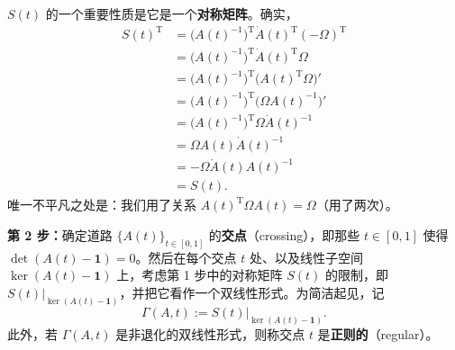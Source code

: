 $S(t)$ 的一个重要性质是它是一个\textbf{对称矩阵}。确实，
\begin{equation*}
\begin{aligned}
  S(t)^{\mathrm T}
    &=\bigl(A(t)^{-1}\bigr)^{\mathrm T}\dot A(t)^{\mathrm T}(-\Omega)^{\mathrm T}\\
    &=\bigl(A(t)^{-1}\bigr)^{\mathrm T}\dot A(t)^{\mathrm T}\Omega\\
    &=\bigl(A(t)^{-1}\bigr)^{\mathrm T}\bigl(A(t)^{\mathrm T}\Omega\bigr)'\\
    &=\bigl(A(t)^{-1}\bigr)^{\mathrm T}\bigl(\Omega A(t)^{-1}\bigr)'\\
    &=\bigl(A(t)^{-1}\bigr)^{\mathrm T}\Omega\dot A(t)^{-1}\\
    &=\Omega A(t)\dot A(t)^{-1}\\
    &=-\Omega\dot A(t)A(t)^{-1}\\
    &=S(t).
\end{aligned}
\end{equation*}
唯一不平凡之处是：我们用了关系 $A(t)^{\mathrm T}\Omega A(t)=\Omega$（用了两次）。

\textbf{第 2 步：}确定道路 $\{A(t)\}_{t\in[0,1]}$ 的\textbf{交点}（crossing），即那些
$t\in[0,1]$ 使得 $\det(A(t)-\mathbf{1})=0$。然后在每个交点 $t$ 处、以及线性子空间
$\ker(A(t)-\mathbf{1})$ 上，考虑第 1 步中的对称矩阵 $S(t)$ 的限制，即
$S(t)|_{\ker(A(t)-\mathbf{1})}$，并把它看作一个双线性形式。为简洁起见，记
\begin{equation}\tag{5.26}
  \Gamma(A,t):=S(t)\big|_{\ker(A(t)-\mathbf{1})}.
\end{equation}
此外，若 $\Gamma(A,t)$ 是非退化的双线性形式，则称交点 $t$ 是\textbf{正则的}（regular）。

